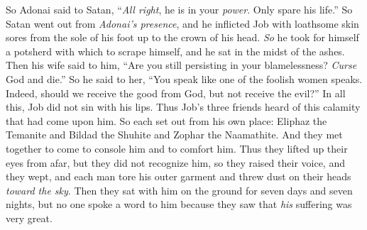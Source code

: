 \begin{biblechapter}
\verse So Adonai said to Satan, “\textit{All right}, he is in your \textit{power}. Only spare his life.”
 So Satan went out from \textit{Adonai’s presence}, and he inflicted Job with loathsome skin sores from the sole of his foot up to the crown of his head.
\verse \textit{So} he took for himself a potsherd with which to scrape himself, and he sat in the midst of the ashes.
\verse Then his wife said to him, “Are you still persisting in your blamelessness? \textit{Curse} God and die.”
\verse So he said to her, “You speak like one of the foolish women speaks. Indeed, should we receive the good from God, but not receive the evil?” In all this, Job did not sin with his lips.
\verse Thus Job’s three friends heard of this calamity that had come upon him. So each set out from his own place: Eliphaz the Temanite and Bildad the Shuhite and Zophar the Naamathite. And they met together to come to console him and to comfort him.
\verse Thus they lifted up their eyes from afar, but they did not recognize him, so they raised their voice, and they wept, and each man tore his outer garment and threw dust on their heads \textit{toward the sky}.
\verse Then they sat with him on the ground for seven days and seven nights, but no one spoke a word to him because they saw that \textit{his} suffering was very great.
\end{biblechapter}

